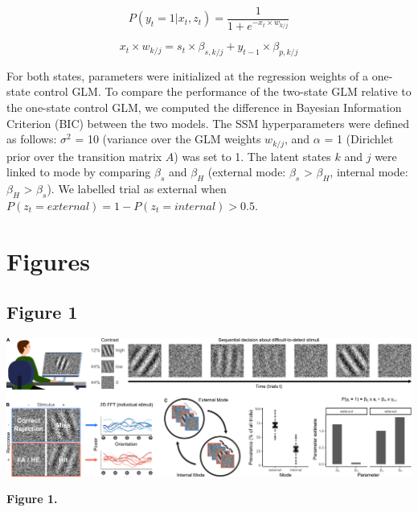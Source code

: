\documentclass[
]{article}
\begin{document}
\begin{equation}
P(y_t = 1 | x_t, z_t) = \frac{1}{1 + e^{-x_t \times w_{k/j}}} 
\end{equation}

\begin{equation}
x_t \times w_{k/j} =  s_t \times \beta_{s,k/j} + y_{t-1} \times \beta_{p,k/j} 
\end{equation}

For both states, parameters were initialized at the regression weights
of a one-state control GLM. To compare the performance of the two-state
GLM relative to the one-state control GLM, we computed the difference in
Bayesian Information Criterion (BIC) between the two models. The SSM
hyperparameters were defined as follows: \(\sigma^2\) = 10 (variance
over the GLM weights \(w_{k/j}\), and \(\alpha\) = 1 (Dirichlet prior
over the transition matrix \(A\)) was set to 1. The latent states \(k\)
and \(j\) were linked to mode by comparing \(\beta_s\) and \(\beta_H\)
(external mode: \(\beta_s\) \textgreater{} \(\beta_H\), internal mode:
\(\beta_H\) \textgreater{} \(\beta_s\)). We labelled trial as external
when \(P(z_t = external) = 1 - P(z_t = internal) > 0.5\).

\newpage

\hypertarget{figures}{%
\section{Figures}\label{figures}}

\hypertarget{figure-1}{%
\subsection{Figure 1}\label{figure-1}}

\includegraphics{./predictive_templates_files/figure-latex/Figure_1.png}

\textbf{Figure 1.}
\end{document}
